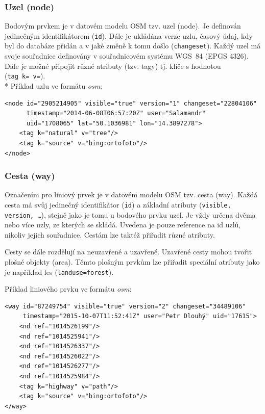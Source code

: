 \subsubsection{Uzel (node) }

Bodovým prvkem je v datovém modelu OSM tzv. uzel (node). Je definován jedinečným
identifikátorem ({\tt id}). 
Dále je ukládána verze uzlu, časový údaj, kdy byl do databáze přidán
a v jaké změně k tomu došlo ({\tt changeset}).
Každý uzel má svoje souřadnice definovány v souřadnicovém systému WGS~84 (EPGS 4326). 
Dále je možné připojit různé atributy (tzv. tagy) tj. klíče s hodnotou ({\tt tag~k=~v=}).
\\*
Příklad uzlu ve formátu \textit{osm}:

{\scriptsize \begin{lstlisting}
<node id="2905214905" visible="true" version="1" changeset="22804106" 
      timestamp="2014-06-08T06:57:20Z" user="Salamandr" 
      uid="1708065" lat="50.1036981" lon="14.3897278">
    <tag k="natural" v="tree"/>
    <tag k="source" v="bing:ortofoto"/>
</node>
\end{lstlisting} }

\subsubsection{Cesta (way) }

Označením pro liniový prvek je v datovém modelu OSM tzv. cesta (way). 
Každá cesta má svůj jedinečný identifikátor ({\tt id}) a základní atributy ({\tt visible, version, \ldots}), 
stejně jako je tomu u bodového prvku uzel.
Je vždy určena dvěma nebo více uzly, ze kterých se skládá. Uvedena je pouze reference na id uzlů, nikoliv jejich souřadnice.
Cestám lze taktéž přiřadit různé atributy.

Cesty se dále rozdělují na neuzavřené a uzavřené.
Uzavřené cesty mohou tvořit plošné objekty (area). Těmto plošným prvkům lze přiřadit speciální atributy jako je například les ({\tt landuse=forest}).

Příklad liniového prvku ve formátu \textit{osm}:

{\scriptsize
\begin{lstlisting}
<way id="87249754" visible="true" version="2" changeset="34489106"
     timestamp="2015-10-07T11:52:41Z" user="Petr Dlouhý" uid="17615">
    <nd ref="1014526199"/>
    <nd ref="1014525941"/>
    <nd ref="1014526337"/>
    <nd ref="1014526022"/>
    <nd ref="1014526277"/>
    <nd ref="1014525984"/>
    <tag k="highway" v="path"/>
    <tag k="source" v="bing:ortofoto"/>
</way>
\end{lstlisting}
}
      
